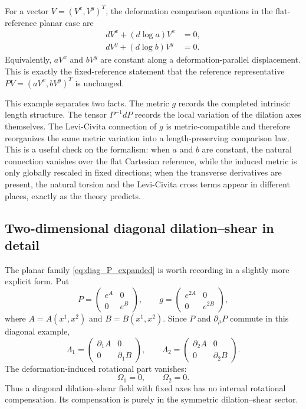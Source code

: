 \documentclass[12pt]{amsart}
\theoremstyle{definition}
\theoremstyle{remark}
\begin{document}
For a vector $V=(V^x,V^y)^T$, the deformation comparison equations in the flat-reference planar case are
\begin{align}
 dV^x+(d\log a)V^x&=0,\\
 dV^y+(d\log b)V^y&=0.
\end{align}
Equivalently, $aV^x$ and $bV^y$ are constant along a deformation-parallel displacement.  This is exactly the fixed-reference statement that the reference representative $PV=(aV^x,bV^y)^T$ is unchanged.

This example separates two facts.  The metric $g$ records the completed intrinsic length structure.  The tensor $P^{-1}dP$ records the local variation of the dilation axes themselves.  The Levi-Civita connection of $g$ is metric-compatible and therefore reorganizes the same metric variation into a length-preserving comparison law.  This is a useful check on the formalism: when $a$ and $b$ are constant, the natural connection vanishes over the flat Cartesian reference, while the induced metric is only globally rescaled in fixed directions; when the transverse derivatives are present, the natural torsion and the Levi-Civita cross terms appear in different places, exactly as the theory predicts.



\subsection{Two-dimensional diagonal dilation--shear in detail}\label{subsec:diagonal_dilation_shear_detail_v2}

The planar family \eqref{eq:diag_P_expanded} is worth recording in a slightly more explicit form.  Put
\begin{equation}\label{eq:diag_exp_AB_v2}
 P=\begin{pmatrix}e^A&0\\0&e^B\end{pmatrix},
 \qquad
 g=\begin{pmatrix}e^{2A}&0\\0&e^{2B}\end{pmatrix},
\end{equation}
where \(A=A(x^1,x^2)\) and \(B=B(x^1,x^2)\).  Since \(P\) and \(\partial_\mu P\) commute in this diagonal example,
\begin{equation}\label{eq:diag_Lambda_AB_v2}
 \Lambda_1=\begin{pmatrix}\partial_1A&0\\0&\partial_1B\end{pmatrix},
 \qquad
 \Lambda_2=\begin{pmatrix}\partial_2A&0\\0&\partial_2B\end{pmatrix}.
\end{equation}
The deformation-induced rotational part vanishes:
\begin{equation}\label{eq:diag_Omega_zero_v2}
 \Omega_1=0,
 \qquad
 \Omega_2=0.
\end{equation}
Thus a diagonal dilation--shear field with fixed axes has no internal rotational compensation.  Its compensation is purely in the symmetric dilation--shear sector.
\end{document}
